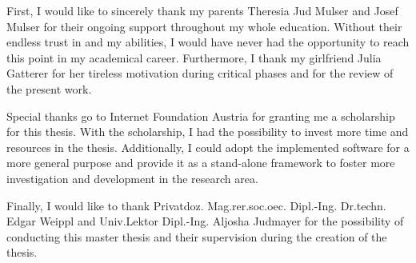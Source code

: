 First, I would like to sincerely thank my parents Theresia Jud Mulser and Josef Mulser for their ongoing support throughout my whole education. Without their endless trust in and my abilities, I would have never had the opportunity to reach this point in my academical career. Furthermore, I thank my girlfriend Julia Gatterer for her tireless motivation during critical phases and for the review of the present work.

Special thanks go to Internet Foundation Austria for granting me a scholarship for this thesis. With the scholarship, I had the possibility to invest more time and resources in the thesis. Additionally, I could adopt the implemented software for a more general purpose and provide it as a stand-alone framework to foster more investigation and development in the research area.

Finally, I would like to thank Privatdoz. Mag.rer.soc.oec. Dipl.-Ing. Dr.techn. Edgar Weippl and Univ.Lektor Dipl.-Ing. Aljosha Judmayer for the possibility of conducting this master thesis and their supervision during the creation of the thesis.
